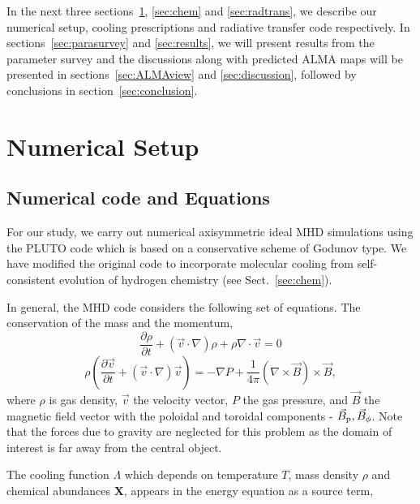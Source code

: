 \documentclass[useAMS,usenatbib]{mn2e}
\begin{document}
In the next three sections~\ref{sec:numsetup}, \ref{sec:chem} and
\ref{sec:radtrans}, we describe our numerical setup, cooling
prescriptions and radiative transfer code respectively. In
sections~\ref{sec:parasurvey} and \ref{sec:results}, we will present results from the parameter survey and the
discussions along with predicted ALMA maps will be presented in
sections~\ref{sec:ALMAview} and \ref{sec:discussion}, followed by
conclusions in section~\ref{sec:conclusion}.

\section{Numerical Setup}
\label{sec:numsetup}
\subsection{Numerical code and Equations}
For our study, we carry out numerical axisymmetric ideal MHD simulations using the PLUTO code \citep{Mignone:2007p644} which is based on a conservative scheme of Godunov type.
We have modified the original code to incorporate molecular cooling
from self-consistent evolution of hydrogen chemistry (see Sect.~\ref{sec:chem}).

  
In general, the MHD code considers the following set of equations.
The conservation of the mass and the momentum,
%
\begin{equation}\label{masscons}
\frac{\partial \rho}{\partial t} + (\vec{v} \cdot \nabla)\rho  +
\rho \nabla \cdot \vec{v} = 0
\end{equation}
%
\begin{equation}\label{momcons}
\rho(\frac{\partial \vec{v}}{\partial t} +
(\vec{v} \cdot \nabla) \vec{v}) =
- \nabla P + \frac{1}{4\pi} (\nabla \times \vec{B}) \times \vec{B},
\end{equation}
%
where $\rho$ is gas density, $\vec{v}$ the velocity vector, $P$ the gas pressure,
and $\vec{B}$ the magnetic field vector with the poloidal and toroidal
components - $\vec{B}_{\rm p}, \vec{B}_{\phi}$. Note that the forces due
to gravity are neglected for this problem as the domain of interest is
far away from the central object.  
%

The cooling function $\Lambda$ which depends on temperature $T$, mass density $\rho$ and
chemical abundances {\bf{X}}, appears in the
energy equation as a source term,
\end{document}

